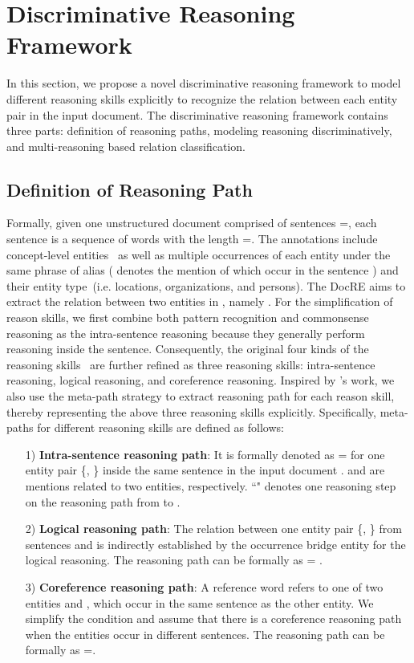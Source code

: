 \documentclass[11pt,a4paper]{article}
\begin{document}
\section{Discriminative Reasoning Framework}
\label{sec2}
In this section, we propose a novel discriminative reasoning framework to model different reasoning skills explicitly to recognize the relation between each entity pair in the input document.
The discriminative reasoning framework contains three parts: definition of reasoning paths, modeling reasoning discriminatively, and multi-reasoning based relation classification.


\subsection{Definition of Reasoning Path}
\label{sec2-1}
Formally, given one unstructured document comprised of  sentences =, each sentence is a sequence of words  with the length =.
The annotations include concept-level entities~ as well as multiple occurrences of each entity under the same phrase of alias  ( denotes the mention of  which occur in the sentence ) and their entity type~(i.e. locations, organizations, and persons).
The DocRE aims to extract the relation between two entities in , namely .
For the simplification of reason skills, we first combine both pattern recognition and commonsense reasoning as the intra-sentence reasoning because they generally perform reasoning inside the sentence.
Consequently, the original four kinds of the reasoning skills~\cite{yao-etal-2019-docred} are further refined as three reasoning skills: intra-sentence reasoning, logical reasoning, and coreference reasoning.
Inspired by \citeauthor{docred-rec}'s work, we also use the meta-path strategy to extract reasoning path for each reason skill, thereby representing the above three reasoning skills explicitly.
Specifically, meta-paths for different reasoning skills are defined as follows:
\begin{enumerate}
\item[1)] \textbf{Intra-sentence reasoning path}: It is formally denoted as = for one entity pair \{, \} inside the same sentence  in the input document . 
 and  are mentions related to two entities, respectively. 
``" denotes one reasoning step on the reasoning path from  to .

\item[2)] \textbf{Logical reasoning path}: The relation between one entity pair \{, \} from sentences  and  is indirectly established by the occurrence bridge entity  for the logical reasoning.
The reasoning path can be formally as =
.

\item[3)] \textbf{Coreference reasoning path}: 
A reference word refers to one of two entities  and , which occur in the same sentence as the other entity.
We simplify the condition and assume that there is a coreference reasoning path when the entities occur in different sentences.
The reasoning path can be formally as =.

\end{enumerate}
\end{document}
